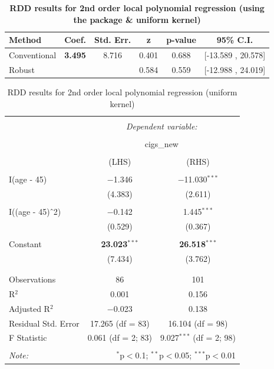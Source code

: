 \documentclass[a4paper]{article}
\begin{document}
\begin{table}[ht!]
	\caption{\textbf{RDD results for 2nd order local polynomial regression (using the package \& uniform kernel)}} 
	\begin{center}
		\begin{threeparttable}
			\begin{tabular}{lccccc}
				\hline
				Method & Coef. & Std. Err. & z & p-value & 95\% C.I. \\
				\hline
				Conventional  & \textbf{3.495}  & 8.716  & 0.401  & 0.688  &  [-13.589 , 20.578]    \\
				Robust      &           &    & 0.584 &    0.559 &  [-12.988 , 24.019]    \\
				\hline
			\end{tabular}
		\end{threeparttable}
	\end{center}
\end{table}

\begin{table}[!htbp] \centering 
	\caption{RDD results for 2nd order local polynomial regression (uniform kernel)} 
	\label{} 
	\begin{tabular}{@{\extracolsep{5pt}}lcc} 
		\\[-1.8ex]\hline 
		\hline \\[-1.8ex] 
		& \multicolumn{2}{c}{\textit{Dependent variable:}} \\ 
		\cline{2-3} 
		\\[-1.8ex] & \multicolumn{2}{c}{cigs\_new} \\ 
		\\[-1.8ex] & (LHS) & (RHS)\\ 
		\hline \\[-1.8ex] 
		I(age - 45) & $-$1.346 & $-$11.030$^{***}$ \\ 
		& (4.383) & (2.611) \\ 
		& & \\ 
		I((age - 45)$\hat{\mkern6mu}$2) & $-$0.142 & 1.445$^{***}$ \\ 
		& (0.529) & (0.367) \\ 
		& & \\ 
		Constant & \textbf{23.023}$^{***}$ & \textbf{26.518}$^{***}$ \\ 
		& (7.434) & (3.762) \\ 
		& & \\ 
		\hline \\[-1.8ex] 
		Observations & 86 & 101 \\ 
		R$^{2}$ & 0.001 & 0.156 \\ 
		Adjusted R$^{2}$ & $-$0.023 & 0.138 \\ 
		Residual Std. Error & 17.265 (df = 83) & 16.104 (df = 98) \\ 
		F Statistic & 0.061 (df = 2; 83) & 9.027$^{***}$ (df = 2; 98) \\ 
		\hline 
		\hline \\[-1.8ex] 
		\textit{Note:}  & \multicolumn{2}{r}{$^{*}$p$<$0.1; $^{**}$p$<$0.05; $^{***}$p$<$0.01} \\ 
	\end{tabular} 
\end{table} 
\end{document}
